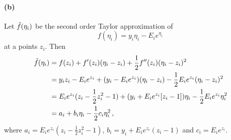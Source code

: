 \paragraph{(b)}
Let $\Tilde{f}(\eta_i)$ be the second order Taylor approximation of 
%
\begin{equation*}
    f(\eta_i) = y_i \eta_i - E_i e^{\eta_i} \,
\end{equation*}
%
at a points $z_i$. Then
%
\begin{align*}
    \Tilde{f}(\eta_i) &= f(z_i) + f'(z_i)(\eta_i - z_i) + \frac{1}{2} f''(z_i)(\eta_i - z_i)^2 \\
    &= y_i z_i - E_i e^{z_i} + (y_i - E_i e^{z_i}) (\eta_i - z_i) - \frac{1}{2} E_i e^{z_i} (\eta_i - z_i)^2 \\
    &= E_i e^{z_i}(z_i - \frac{1}{2} z_i^2 - 1) + (y_i + E_i e^{z_i} [z_i - 1]) \eta_i - \frac{1}{2} E_i e^{z_i} \eta_i^2 \\
    &= a_i + b_i \eta_i - \frac{1}{2} c_i \eta_i^2 \, ,
\end{align*}
%
where $a_i = E_i e^{z_i}(z_i - \frac{1}{2} z_i^2 - 1)$, $b_i = y_i + E_i e^{z_i} (z_i - 1)$ and $c_i = E_i e^{z_i}$.

